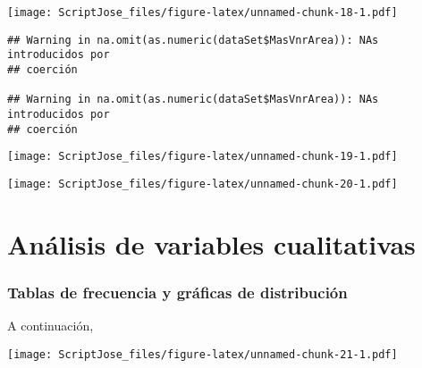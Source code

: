 \documentclass[
]{article}
\newenvironment{Shaded}{\begin{snugshade}}{\end{snugshade}}
\newcommand{\DataTypeTok}[1]{\textcolor[rgb]{0.13,0.29,0.53}{#1}}
\newcommand{\KeywordTok}[1]{\textcolor[rgb]{0.13,0.29,0.53}{\textbf{#1}}}
\newcommand{\NormalTok}[1]{#1}
\newcommand{\OperatorTok}[1]{\textcolor[rgb]{0.81,0.36,0.00}{\textbf{#1}}}
\newcommand{\StringTok}[1]{\textcolor[rgb]{0.31,0.60,0.02}{#1}}
\begin{document}
\texttt{[image: ScriptJose\_files/figure-latex/unnamed-chunk-18-1.pdf]}

\begin{verbatim}
## Warning in na.omit(as.numeric(dataSet$MasVnrArea)): NAs introducidos por
## coerción

## Warning in na.omit(as.numeric(dataSet$MasVnrArea)): NAs introducidos por
## coerción
\end{verbatim}

\texttt{[image: ScriptJose\_files/figure-latex/unnamed-chunk-19-1.pdf]}

\texttt{[image: ScriptJose\_files/figure-latex/unnamed-chunk-20-1.pdf]}

\hypertarget{anuxe1lisis-de-variables-cualitativas}{%
\section{Análisis de variables
cualitativas}\label{anuxe1lisis-de-variables-cualitativas}}

\hypertarget{tablas-de-frecuencia-y-gruxe1ficas-de-distribuciuxf3n}{%
\subsubsection{Tablas de frecuencia y gráficas de
distribución}\label{tablas-de-frecuencia-y-gruxe1ficas-de-distribuciuxf3n}}

A continuación,

\begin{Shaded}
\end{Shaded}

\texttt{[image: ScriptJose\_files/figure-latex/unnamed-chunk-21-1.pdf]}

\begin{Shaded}
\end{Shaded}
\end{document}
